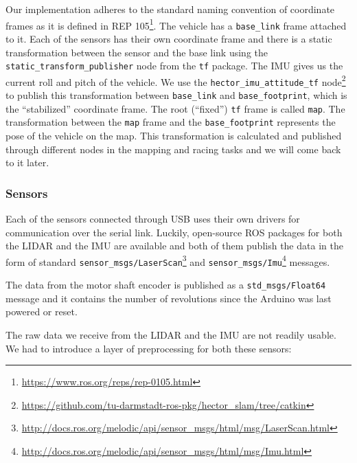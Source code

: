 Our implementation adheres to the standard naming convention of coordinate frames as it is defined in \gls{REP} 105\footnote{\url{https://www.ros.org/reps/rep-0105.html}}. The vehicle has a \verb|base_link| frame attached to it. Each of the sensors has their own coordinate frame and there is a static transformation between the sensor and the base link using the \texttt{static\_\allowbreak transform\_\allowbreak publisher} node from the \verb|tf| package. The \gls*{IMU} gives us the current roll and pitch of the vehicle. We use the \texttt{hector\_imu\_attitude\_tf} node\footnote{\url{https://github.com/tu-darmstadt-ros-pkg/hector\_slam/tree/catkin}} to publish this transformation between \texttt{base\_link} and \texttt{base\_footprint}, which is the ``stabilized'' coordinate frame. The root (``fixed'') \verb|tf| frame is called \verb|map|. The transformation between the \verb|map| frame and the \verb|base_footprint| represents the pose of the vehicle on the map. This transformation is calculated and published through different nodes in the mapping and racing tasks and we will come back to it later.

\subsubsection{Sensors}
\label{sec:sensors}

Each of the sensors connected through USB uses their own drivers for communication over the serial link. Luckily, open-source \gls*{ROS} packages for both the \gls*{LIDAR} and the \gls*{IMU} are available and both of them publish the data in the form of standard \verb|sensor_msgs/LaserScan|\footnote{\url{http://docs.ros.org/melodic/api/sensor\_msgs/html/msg/LaserScan.html}} and \verb|sensor_msgs/Imu|\footnote{\url{http://docs.ros.org/melodic/api/sensor\_msgs/html/msg/Imu.html}} messages.

The data from the motor shaft encoder is published as a \verb|std_msgs/Float64| message and it contains the number of revolutions since the Arduino was last powered or reset.

The raw data we receive from the \gls*{LIDAR} and the \gls*{IMU} are not readily usable. We had to introduce a layer of preprocessing for both these sensors:

